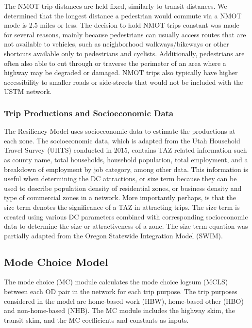 The NMOT trip distances are held fixed, similarly to transit distances. We
determined that the longest distance a pedestrian would commute via a NMOT
mode is 2.5 miles or less. The decision to hold NMOT
trips constant was made for several reasons, mainly because pedestrians can usually
access routes that are not available to vehicles, such as neighborhood walkways/bikeways
or other shortcuts available only to pedestrians and cyclists. Additionally,
pedestrians are often also able to cut through or traverse the perimeter of an
area where a highway may be degraded or damaged. NMOT trips also typically have
higher accessibility to smaller roads or side-streets that would not be included
with the USTM network.

\subsubsection{Trip Productions and Socioeconomic Data}

The Resiliency Model uses socioeconomic data to estimate the productions at
each zone. The socioeconomic data, which is adapted from the Utah Household
Travel Survey (UHTS) conducted in 2015, contains TAZ related information such
as county name, total households, household population, total employment,
and a breakdown of employment by job category, among other data. This information is useful
when determining the DC attractions, or size term because they can be used to
describe population density of residential zones, or business density and type
of commercial zones in a network. More importantly perhaps, is that the size
term denotes the significance of a TAZ in attracting trips. The size term is
created using various DC parameters combined with corresponding socioeconomic data
to determine the size or attractiveness of a zone. The size term equation was partially
adapted from the Oregon Statewide Integration Model (SWIM).

\subsection{Mode Choice Model}

The mode choice (MC) module calculates the mode choice logsum (MCLS) between each OD pair in the
network for each trip purpose. The trip purposes considered in the model are home-based work
(HBW), home-based other (HBO) and non-home-based (NHB). The MC module includes the highway skim,
the transit skim, and the MC coefficients and constants as inputs.

